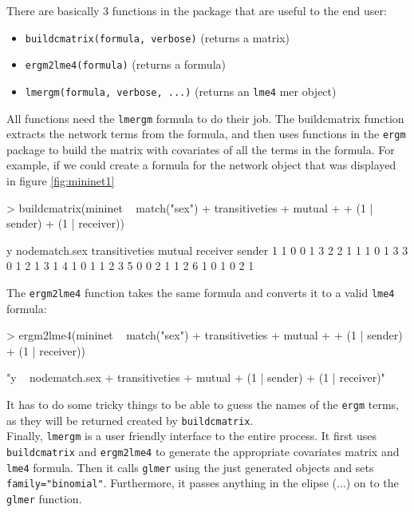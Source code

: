 \documentclass[a4paper]{article}
\begin{document}
\begin{appendices}
There are basically 3 functions in the package that are useful to the end user:
\begin{itemize}
\item \texttt{buildcmatrix(formula, verbose)} (returns a matrix)
\item \texttt{ergm2lme4(formula)} (returns a formula)
\item \texttt{lmergm(formula, verbose, ...)} (returns an \texttt{lme4} mer object)
\end{itemize}
All functions need the \texttt{lmergm} formula to do their job. The buildcmatrix function extracts the network terms from the formula, 
and then uses functions in the \texttt{ergm} package to build the matrix with covariates of all the terms in the formula. 
For example, if we could create a formula for the network object that was displayed in figure \ref{fig:mininet1}
\begin{Schunk}
\begin{Sinput}
> buildcmatrix(mininet ~ match("sex") + transitiveties + mutual + 
+     (1 | sender) + (1 | receiver))
\end{Sinput}
\begin{Soutput}
  y nodematch.sex transitiveties mutual receiver sender
1 1             0              0      1        3      2
2 1             1              1      0        1      3
3 0             1              2      1        3      1
4 1             0              1      1        2      3
5 0             0              2      1        1      2
6 1             0              1      0        2      1
\end{Soutput}
\end{Schunk}

The \texttt{ergm2lme4} function takes the same formula and converts it to a valid \texttt{lme4} formula:
\begin{Schunk}
\begin{Sinput}
> ergm2lme4(mininet ~ match("sex") + transitiveties + mutual + 
+     (1 | sender) + (1 | receiver))
\end{Sinput}
\begin{Soutput}
[1] "y ~  nodematch.sex + transitiveties + mutual + (1 | sender) + (1 | receiver)"
\end{Soutput}
\end{Schunk}
It has to do some tricky things to be able to guess the names of the \texttt{ergm} terms, as they will be returned created by \texttt{buildcmatrix}. \\

Finally, \texttt{lmergm} is a user friendly interface to the entire process. It first uses \texttt{buildcmatrix} and \texttt{ergm2lme4}
to generate the appropriate covariates matrix and \texttt{lme4} formula. Then it calls \texttt{glmer} using the just generated objects and sets
\texttt{family="binomial"}. Furthermore, it passes anything in the elipse (...) on to the \texttt{glmer} function. 


\end{appendices}
\end{document}
